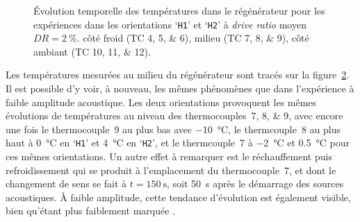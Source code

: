 \begin{figure}[!ht]
    \centering
	\begin{subfigure}{\textwidth}
		\centering
        
		\caption{}
		\label{fig:Acou_CHXin_H1H2_Mid}
	\end{subfigure}		
	\begin{subfigure}{\textwidth}
		\centering
        
		\caption{}
		\label{fig:Acou_Regmid_H1H2_Mid}
	\end{subfigure}
	\begin{subfigure}{\textwidth}
		\centering
        
		\caption{}
		\label{fig:Acou_AHXin_H1H2_Mid}
	\end{subfigure}	
    \caption{\'Evolution temporelle des températures dans le régénérateur pour les expériences dans les orientations `\texttt{H1}' et `\texttt{H2}' à  \textit{drive ratio} moyen $DR=\qty{2}{\percent}$.  côté froid (TC \numlist{4;5;6}),  milieu (TC \numlist{7;8;9}),  côté ambiant (TC \numlist{10;11;12}).} 
    \label{fig:Acou_H1H2_Mid}
\end{figure}

Les températures mesurées au milieu du régénérateur sont tracés sur la figure~\ref{fig:Acou_Regmid_H1H2_Mid}. Il est possible d'y voir, à nouveau, les mêmes phénomènes que dans l'expérience à faible amplitude acoustique. Les deux orientations provoquent les mêmes évolutions de températures au niveau des thermocouples~\numlist{7;8;9}, avec encore une fois le thermocouple~9 au plus bas avec \qty{-10}{\degreeCelsius}, le thermcouple~8 au plus haut à \qty{0}{\degreeCelsius} en `\texttt{H1}' et \qty{4}{\degreeCelsius} en `\texttt{H2}', et le thermcouple~7 à \qty{-2}{\degreeCelsius} et \qty{.5}{\degreeCelsius} pour ces mêmes orientations. Un autre effet à remarquer est le réchauffement puis refroidissement qui se produit à l'emplacement du thermocouple~7, et dont le changement de sens se fait à $t=\qty{150}{\second}$, soit \qty{50}{\second} après le démarrage des sources acoustiques. À faible amplitude, cette tendance d'évolution est également visible, bien qu'étant plus faiblement marquée . 

